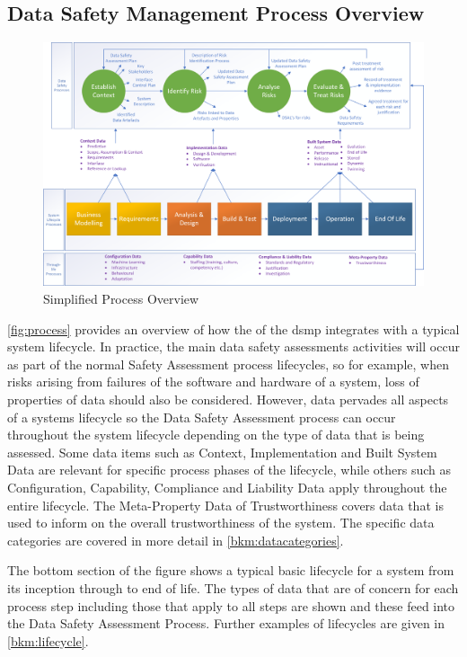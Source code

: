 \subsection{Data Safety Management Process Overview}
\begin{figure}[hb]
\centering
\includegraphics[angle=90,scale=0.7]{images/process_diagram}
\caption{Simplified Process Overview}
\label{fig:process}
\end{figure}

\autoref{fig:process} provides an overview of how the of the \gls{dsmp}
integrates with a typical system lifecycle. In practice, the main data safety assessments activities will
occur as part of the normal Safety Assessment process lifecycles, so for example, when risks arising
from failures of the software and hardware of a system, loss of properties of data should also be
considered. However, data pervades all aspects of a systems lifecycle so the Data Safety Assessment
process can occur throughout the system lifecycle depending on the type of data that is being
assessed. Some data items such as Context, Implementation and Built System Data are relevant for
specific process phases of the lifecycle, while others such as Configuration, Capability, Compliance and
Liability Data apply throughout the entire lifecycle. The Meta-Property Data of Trustworthiness
covers data that is used to inform on the overall trustworthiness of the system. The specific data
categories are covered in more detail in \autoref{bkm:datacategories}.

The bottom section of the figure shows a typical basic lifecycle for a system from its inception
through to end of life. The types of data that are of concern for each process step including those
that apply to all steps are shown and these feed into the Data Safety Assessment Process. Further
examples of lifecycles are given in \autoref{bkm:lifecycle}.
\cbend

